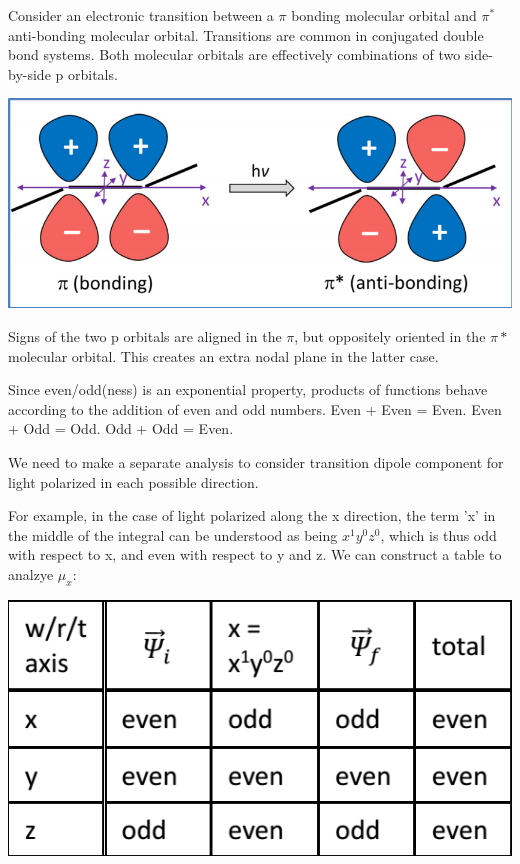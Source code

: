 \documentclass[12pt, letterpaper]{article}
\begin{document}
Consider an electronic transition between a $\pi$ bonding molecular orbital and $\pi^*$ anti-bonding molecular orbital. 
Transitions are common in conjugated double bond systems. Both molecular orbitals are effectively combinations of two side-by-side 
p orbitals. 

\begin{center}
    \includegraphics[scale = 0.5]{pi orbitals.png}
\end{center}

Signs of the two p orbitals are aligned in the $\pi$, but oppositely oriented in the $\pi*$ molecular orbital. 
This creates an extra nodal plane in the latter case. 

Since even/odd(ness) is an exponential property, products of functions behave according to the addition of even and odd numbers. 
Even + Even = Even. Even + Odd = Odd. Odd + Odd = Even. 

We need to make a separate analysis to consider transition dipole component for light polarized in each possible direction. 

For example, in the case of light polarized along the x direction, the term 'x' in the middle of the integral can be understood as being 
\( x^1y^0z^0 \), which is thus odd with respect to x, and even with respect to y and z. We can construct a table to analzye $\mu_x$:

\begin{center}
    \includegraphics{wavefunctions.png}
\end{center}
\newpage
\end{document}
